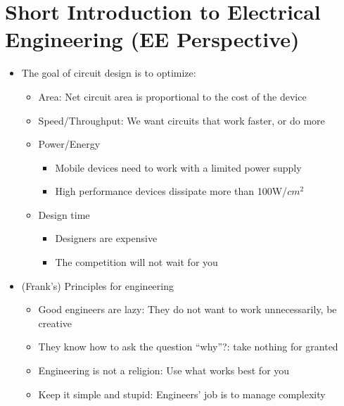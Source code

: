 \documentclass[a4paper]{article}
\begin{document}
\section{Short Introduction to Electrical Engineering (EE Perspective)}
\begin{itemize}
\item The goal of circuit design is to optimize:
\begin{itemize}
\item Area: Net circuit area is proportional to the cost of the device
\item Speed/Throughput: We want circuits that work  faster, or do more
\item Power/Energy
\begin{itemize}
\item Mobile devices need to work with a limited power supply
\item High performance devices dissipate more than 100W/$cm^2$
\end{itemize}
\item Design time
\begin{itemize}
\item Designers are expensive
\item The competition will not wait for you
\end{itemize}
\end{itemize}
\item (Frank's) Principles for engineering
\begin{itemize}
\item Good engineers are lazy: They do not want to work unnecessarily, be creative
\item They know how to ask the question ``why''?: take nothing for granted
\item Engineering is not a religion: Use what works best for you
\item Keep it simple and stupid: Engineers' job is to manage complexity
\end{itemize}
\end{itemize}
\end{document}
